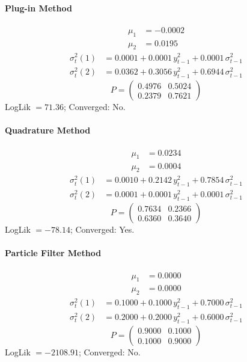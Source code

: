 \documentclass[11pt, a4paper]{article}
\begin{document}
\paragraph{Plug-in Method}
\begin{align}
\mu_{1} &= -0.0002 \\
\mu_{2} &= 0.0195
\end{align}
\begin{align}
\sigma^2_{t}(1) &= 0.0001 + 0.0001\, y_{t-1}^2 + 0.0001\, \sigma^2_{t-1} \\
\sigma^2_{t}(2) &= 0.0362 + 0.3056\, y_{t-1}^2 + 0.6944\, \sigma^2_{t-1}
\end{align}
\begin{equation}
P = \begin{pmatrix} 0.4976 & 0.5024 \\ 0.2379 & 0.7621 \end{pmatrix}
\end{equation}
LogLik $= 71.36$; Converged: No.

\paragraph{Quadrature Method}
\begin{align}
\mu_{1} &= 0.0234 \\
\mu_{2} &= 0.0004
\end{align}
\begin{align}
\sigma^2_{t}(1) &= 0.0010 + 0.2142\, y_{t-1}^2 + 0.7854\, \sigma^2_{t-1} \\
\sigma^2_{t}(2) &= 0.0001 + 0.0001\, y_{t-1}^2 + 0.0001\, \sigma^2_{t-1}
\end{align}
\begin{equation}
P = \begin{pmatrix} 0.7634 & 0.2366 \\ 0.6360 & 0.3640 \end{pmatrix}
\end{equation}
LogLik $= -78.14$; Converged: Yes.

\paragraph{Particle Filter Method}
\begin{align}
\mu_{1} &= 0.0000 \\
\mu_{2} &= 0.0000
\end{align}
\begin{align}
\sigma^2_{t}(1) &= 0.1000 + 0.1000\, y_{t-1}^2 + 0.7000\, \sigma^2_{t-1} \\
\sigma^2_{t}(2) &= 0.2000 + 0.2000\, y_{t-1}^2 + 0.6000\, \sigma^2_{t-1}
\end{align}
\begin{equation}
P = \begin{pmatrix} 0.9000 & 0.1000 \\ 0.1000 & 0.9000 \end{pmatrix}
\end{equation}
LogLik $= -2108.91$; Converged: No.
\end{document}
